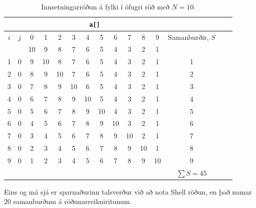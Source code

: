 \documentclass[12pt, a4paper, hidelinks]{article}
\begin{document}
\newcommand{\g}{\color{lightgray}}
\newcommand{\curr}{\color{red}}
\begin{table}[ht!]
    \centering
    \begin{tabular}[pos]{cc|ccccccccccccc}
    \multicolumn{2}{c}{} & \multicolumn{10}{c}{\texttt{a[]}} \\
    \toprule
    $i$ & $j$ & 0 & 1 & 2 & 3 & 4 & 5 & 6 & 7 & 8  & 9 & Samanburðir, $S$ \\
    \midrule
        &     & 10 & 9 & 8 & 7 & 6 & 5 & 4 & 3 & 2 & 1 \\
    1   & 0   & \curr 9 & 10 & \g 8 & \g 7 & \g 6 & \g 5 & \g 4 & \g 3 & \g 2 & \g 1 & 1 \\
    2   & 0   & \curr 8 & 9  & 10 & \g 7 & \g 6 & \g 5 & \g 4 & \g 3 & \g 2 & \g 1 & 2 \\ 
    3   & 0   & \curr 7 & 8  & 9  & 10 & \g 6 & \g 5 & \g 4 & \g 3 & \g 2 & \g 1 & 3\\ 
    4   & 0   & \curr 6 & 7  & 8  & 9  & 10 & \g 5 & \g 4 & \g 3 & \g 2 & \g 1 & 4\\
    5   & 0   & \curr 5 & 6  & 7  & 8  & 9  & 10 & \g 4 & \g 3 & \g 2 & \g 1 & 5 \\
    6   & 0   & \curr 4 & 5 & 6 & 7 & 8 & 9 & 10 & \g 3 & \g 2 & \g 1 & 6 \\
    7   & 0   & \curr 3 & 4 & 5 & 6 & 7 & 8 & 9 & 10 & \g 2 & \g 1 & 7 \\
    8   & 0   & \curr 2 & 3 & 4 & 5 & 6 & 7 & 8 & 9 & 10 & \g 1 & 8 \\
    9   & 0   & \curr 1 & 2 & 3 & 4 & 5 & 6 & 7 & 8 & 9 & 10 & 9 \\
    \midrule
    \multicolumn{12}{c}{} & $\sum S = 45$ \\
    \bottomrule
    \end{tabular}
    \caption{Innsetningarröðun á fylki í öfugri röð með $N = 10$.}
\end{table}
\noindent
Eins og má sjá er sparnaðurinn talsverður við að nota Shell röðun, en það munar 20 samanburðum
á röðunarreikniritunum.
\end{document}
